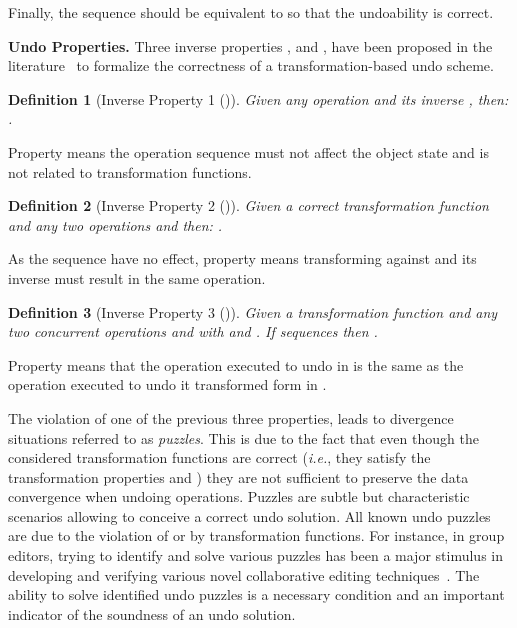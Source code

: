 \documentclass[submission,copyright,creativecommons]{eptcs}
\newtheorem{definition}{Definition}
\begin{document}
Finally, the sequence  should be equivalent to  so that the undoability is correct.



\medskip\noindent\textbf{Undo Properties. }Three inverse properties ,  and , have been proposed in the literature~\cite{Atul94,Sun02,SunS09,Ferrie04} to formalize the correctness of a transformation-based undo scheme.

\begin{definition}[Inverse Property 1 ()]
\label{Def:IP1}
Given  any operation  and its inverse , then:
.\end{definition}


Property  means the operation sequence  must not affect  the object state and is not related to transformation functions.



\begin{definition}[Inverse Property 2 ()]
\label{Def:IP2}
Given a correct transformation function  and any two  operations  and  then:
.
\end{definition}

As the sequence   have no effect, property  means transforming 
against  and its inverse  must result in the same operation.


\begin{definition}[Inverse Property 3 ()]
\label{Def:IP3}
Given a transformation function  and any two  concurrent operations  and  with
 and . If sequences 
 then
.
\end{definition}


Property  means that the operation executed to undo  in  is the same as the operation executed
to undo it transformed form  in .

The violation of one of the previous three properties, leads to divergence situations referred to as \emph{puzzles}. This is due to the fact that even though the considered transformation functions are correct (\textit{i.e.},
they satisfy the transformation properties  and ) they are not sufficient to preserve the data
convergence when undoing operations.
Puzzles are subtle but characteristic scenarios allowing to conceive a correct undo solution.
All known undo puzzles are  due to the
violation of  or   by transformation functions.
For instance, in group editors, trying to identify and solve various puzzles has been a major stimulus in developing and verifying various novel collaborative editing techniques~\cite{Sun98, Ressel99, Sun00}. The ability to solve identified undo puzzles is a necessary condition and an important indicator of the
soundness of an undo solution.  
\end{document}
